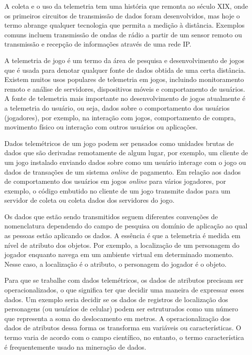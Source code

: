 A coleta e o uso da telemetria tem uma história que remonta ao século XIX, onde os primeiros circuitos de transmissão de dados foram desenvolvidos, mas hoje o termo abrange qualquer tecnologia que permita a medição à distância. Exemplos comuns incluem transmissão de ondas de rádio a partir de um sensor remoto ou transmissão e recepção de informações através de uma rede IP.

A telemetria de jogo é um termo da área de pesquisa e desenvolvimento de jogos que é usada para denotar qualquer fonte de dados obtida de uma certa distância. Existem muitos usos populares de telemetria em jogos, incluindo monitoramento remoto e análise de servidores, dispositivos móveis e comportamento de usuários. A fonte de telemetria mais importante no desenvolvimento de jogos atualmente é a telemetria do usuário, ou seja, dados sobre o comportamento dos usuários (jogadores), por exemplo, na interação com jogos, comportamento de compra, movimento físico ou interação com outros usuários ou aplicações.

Dados telemétricos de um jogo podem ser pensados como unidades brutas de dados que são derivadas remotamente de algum lugar, por exemplo, um cliente de um jogo instalado enviando dados sobre como um usuário interage com o jogo ou dados de transações de um sistema \textit{online} de pagamento. Em relação aos dados de comportamento dos usuários em jogos \textit{online} para vários jogadores, por exemplo, o código embutido no cliente de um jogo transmite dados para um servidor de coleta ou coleta dados dos servidores do jogo.

Os dados que estão sendo transmitidos seguem diferentes convenções de nomenclatura dependendo do campo de pesquisa ou domínio de aplicação ao qual as pessoas estão aplicando os dados. A essência é que a telemetria é medida em nível de atributo dos objetos. Por exemplo, a localização de um personagem do jogador enquanto navega em um ambiente virtual em determinado momento. Nesse caso, a localização é o atributo, o personagem do jogador é o objeto.

Para que se trabalhe com dados telemétricos, os dados de atributos precisam ser operacionalizados, o que significa ter que decidir uma maneira de expressar esses dados. Um exemplo seria decidir se os dados de registros de localização dos personagens (ou usuários de celular) podem ser estruturados como um número que representa a soma do deslocamento em metros. A operacionalização dos dados de atributos dessa forma os transforma em variáveis ou características. O termo varia de acordo com o campo científico, no entanto, o termo característica é frequentemente usado na mineração de dados.

